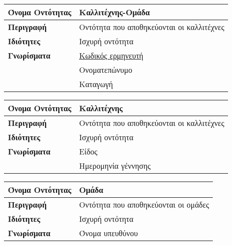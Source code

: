 \begin{center}
\vspace{0.3 cm}

\begin{tabular}[]{|p{4cm}|p{10cm}|}
\hline
\textbf{Όνομα Οντότητας} & Καλλιτέχνης-Ομάδα                         \\ \hline 
\textbf{Περιγραφή}       & Οντότητα που αποθηκεύονται οι καλλιτέχνες \\ \hline 
\textbf{Ιδιότητες}       & Ισχυρή οντότητα                           \\    \hline           
\textbf{Γνωρίσματα}      & \underline{Κωδικός ερμηνευτή}             \\
                         & Ονοματεπώνυμο                             \\
           ~             & Καταγωγή                                  \\
\hline
\end{tabular}
\vspace{0.3 cm}

\begin{tabular}[]{|p{4cm}|p{10cm}|} 
 \hline
\textbf{Όνομα Οντότητας} & Καλλιτέχνης                               \\ \hline 
\textbf{Περιγραφή}       & Οντότητα που αποθηκεύονται οι καλλιτέχνες \\ \hline 
\textbf{Ιδιότητες}       & Ισχυρή οντότητα
                                                                     \\ \hline          
\textbf{Γνωρίσματα}      & Είδος                                     \\
                         & Ημερομηνία γέννησης
                                                                     \\ \hline 
\end{tabular}
\vspace{0.3 cm}

\begin{tabular}[]{|p{4cm}|p{10cm}|}
\hline
\textbf{Όνομα Οντότητας} & Ομάδα                                \\ \hline 
\textbf{Περιγραφή}       & Οντότητα που αποθηκεύονται οι ομάδες \\ \hline 
\textbf{Ιδιότητες}       & Ισχυρή οντότητα                      \\ \hline
\textbf{Γνωρίσματα}      & Όνομα υπευθύνου                      \\ \hline 
\end{tabular}
\vspace{0.3 cm}


\end{center}
